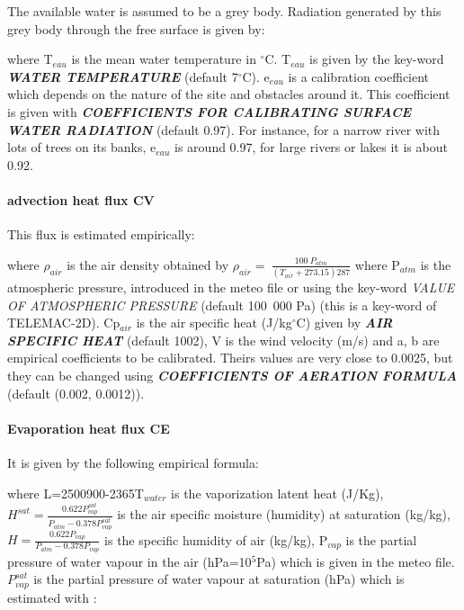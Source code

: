 The available water is assumed to be a grey body. Radiation generated by this grey body through the free surface is given by:

where T${}_{eau}$ is the mean water temperature in ${}^\circ$C. T${}_{eau}$ is given by the key-word \textbf{\textit{WATER TEMPERATURE}} (default 7${}^\circ$C). e${}_{eau}$ is a calibration coefficient which depends on the nature of the site and obstacles around it. This coefficient is given with \textbf{\textit{COEFFICIENTS FOR CALIBRATING SURFACE WATER RADIATION}} (default 0.97). For instance, for a narrow river with lots of trees on its banks, e${}_{eau}$ is around 0.97, for large rivers or lakes it is about 0.92.


\paragraph{ advection heat flux CV}

 This flux is estimated empirically:

 where $\rho_{air}$ is the air density obtained by ${\rho }_{air}=\ \frac{100\ P_{atm}}{\left(T_{air}+273.15\right)287}$ where P${}_{atm}$ is the atmospheric pressure, introduced in the meteo file or using the key-word \textit{VALUE OF ATMOSPHERIC PRESSURE} (default 100~000 Pa) (this is a key-word of TELEMAC-2D). Cp${}_{air}$ is the air specific heat (J/kg${}^\circ$C) given by \textbf{\textit{AIR SPECIFIC HEAT}} (default 1002), V is the wind velocity (m/s) and a, b are empirical coefficients to be calibrated. Theirs values are very close to 0.0025, but they can be changed using \textbf{\textit{COEFFICIENTS OF AERATION FORMULA}} (default (0.002, 0.0012)).


\paragraph{ Evaporation heat flux CE}

 It is given by the following empirical formula:

 where L=2500900-2365T${}_{water}$ is the vaporization latent heat (J/Kg), $H^{sat}=\frac{0.622P^{sat}_{vap}}{P_{atm}-0.378P^{sat}_{vap}}$ is the air specific moisture (humidity) at saturation (kg/kg), $H=\frac{0.622P_{vap}}{P_{atm}-0.378P_{vap}}$ is the specific humidity of air (kg/kg), P${}_{vap}$ is the partial pressure of water vapour in the air (hPa=10${}^{5}$Pa) which is given in the meteo file. $P^{sat}_{vap}$ is the partial pressure of water vapour at saturation (hPa) which is estimated with :

